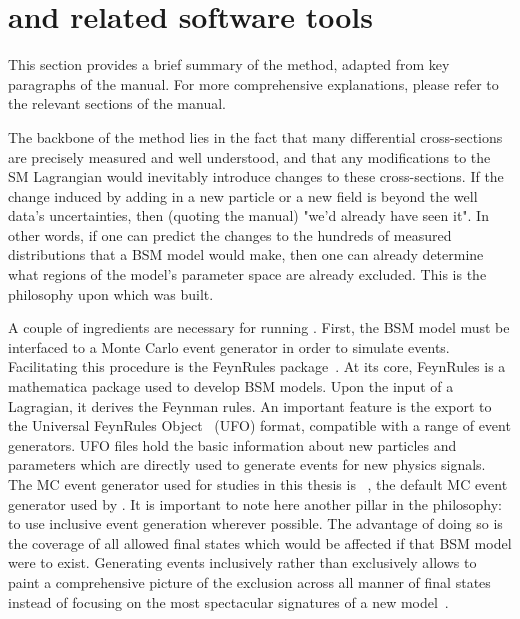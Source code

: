 \section{\contur and related software tools}
\label{sec:reinterpretsoftware}
This section provides a brief summary of the \contur method, adapted from key paragraphs of the manual. For more comprehensive explanations, please refer to the relevant sections of the manual.

The backbone of the \contur method lies in the fact that many differential cross-sections are precisely measured and well understood, and that any modifications to the SM Lagrangian would inevitably introduce changes to these cross-sections. If the change induced by adding in a new particle or a new field is beyond the well data's uncertainties, then (quoting the manual) "we'd already have seen it". In other words, if one can predict the changes to the hundreds of \LHC measured distributions that a BSM model would make, then one can already determine what regions of the model's parameter space are already excluded. This is the philosophy upon which \contur was built. 

A couple of ingredients are necessary for running \contur. First, the BSM model must be interfaced to a Monte Carlo event generator in order to simulate events. Facilitating this procedure is the FeynRules package~\cite{Alloul:2013bka}. At its core, FeynRules is a mathematica package used to develop BSM models. Upon the input of a Lagragian, it derives the Feynman rules. An important feature is the export to the Universal FeynRules Object~\cite{Degrande:2011ua} (UFO) format, compatible with a range of event generators. UFO files hold the basic information about new particles and parameters which are directly used to generate events for new physics signals. The MC event generator used for studies in this thesis is \herwig~\cite{Bahr:2008pv}, the default MC event generator used by \contur. It is important to note here another pillar in the \contur philosophy: to use inclusive event generation wherever possible. The advantage of doing so is the coverage of all allowed final states which would be affected if that BSM model were to exist. Generating events inclusively rather than exclusively allows \contur to paint a comprehensive picture of the exclusion across all manner of final states instead of focusing on the most spectacular signatures of a new model~\cite{conturmanual}. 

